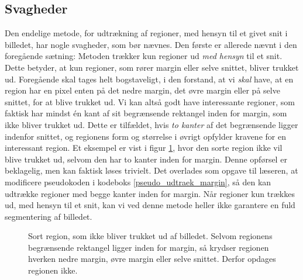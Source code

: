 {\subsection{Svagheder\label{subsec_svagheder}}
Den endelige metode, for udtrækning af regioner, med hensyn til et givet
snit i billedet, har nogle svagheder, som bør nævnes. Den første er
allerede nævnt i den foregående sætning: Metoden trækker kun regioner ud
\emph{med hensyn} til et snit. Dette betyder, at kun regioner, som rører
margin eller selve snittet, bliver trukket ud. Foregående skal tages
helt bogstaveligt, i den forstand, at vi \emph{skal} have, at en region
har en pixel enten på det nedre margin, det øvre margin eller på selve
snittet, for at blive trukket ud. Vi kan altså godt have interessante
regioner, som faktisk har mindst én kant af sit begrænsende rektangel
inden for margin, som ikke bliver trukket ud.  Dette er tilfældet, hvis
\emph{to kanter} af det begrænsende ligger indenfor snittet, og
regionens form og størrelse i øvrigt opfylder kravene for en interessant
region. Et eksempel er vist i figur \ref{respect_to_cut}, hvor den sorte
region ikke vil blive trukket ud, selvom den har to kanter inden for
margin. Denne opførsel er beklagelig, men kan faktisk løses trivielt.
Det overlades som opgave til læseren, at modificere pseudokoden i
kodeboks \ref{pseudo_udtraek_margin}, så den kan udtrække regioner med
begge kanter inden for margin.
Når regioner kun trækkes ud, med hensyn til et snit, kan vi ved denne
metode heller ikke garantere en fuld segmentering af billedet.

\begin{figure}[p]
    \setlength\fboxsep{0pt}
    \setlength\fboxrule{0.5pt}
    \centering
    \caption[]{Sort region, som ikke bliver trukket ud af billedet.
    Selvom regionens begrænsende rektangel ligger inden for margin, så
    krydser regionen hverken nedre margin, øvre margin eller selve
    snittet. Derfor opdages regionen ikke.}
    \label{respect_to_cut}
\end{figure}

}
